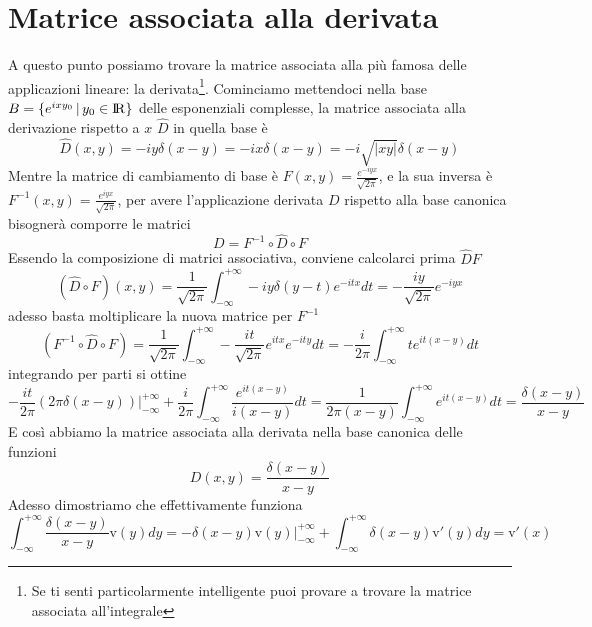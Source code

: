 \documentclass[11pt,a4paper]{report}
\newcommand{\vettorec}[1]{\textrm{#1}}
\theoremstyle{definition}
\theoremstyle{plain}
\theoremstyle{plain}
\begin{document}
		\section{Matrice associata alla derivata}
			A questo punto possiamo trovare la matrice associata alla più famosa delle applicazioni lineare: la derivata\footnote{Se ti senti particolarmente intelligente puoi provare a trovare la matrice associata all'integrale}.\newline
			Cominciamo mettendoci nella base $B=\{e^{ixy_0}\,|\,y_0 \in \rm I\!R \}$ delle esponenziali complesse, la matrice associata alla derivazione rispetto a $x$ $\widehat{D}$ in quella base è 
			\begin{equation}
				\widehat{D}(x,y)=-iy\delta (x-y)=-ix\delta(x-y)=-i\sqrt{|xy|}\delta(x-y)
			\end{equation}
			Mentre la matrice di cambiamento di base è $F(x,y)=\frac{e^{-iyx}}{\sqrt{2\pi}}$, e la sua inversa è $F^{-1}(x,y)=\frac{e^{iyx}}{\sqrt{2\pi}}$, per avere l'applicazione derivata $D$ rispetto alla base canonica bisognerà comporre le matrici
			\begin{equation}
				D=F^{-1}\circ \widehat{D}\circ F
			\end{equation}
			Essendo la composizione di matrici associativa, conviene calcolarci prima $\widehat{D}F$
			\[
				(\widehat{D}\circ F)(x,y)=\frac{1}{\sqrt{2\pi}}\int_{-\infty}^{+\infty}
				-iy\delta(y-t)e^{-itx}dt=-\frac{iy}{\sqrt{2\pi}}e^{-iyx}
			\]
			adesso basta moltiplicare la nuova matrice per $F^{-1}$
			\[
				(F^{-1}\circ \widehat{D}\circ F)=
				\frac{1}{\sqrt{2\pi}}\int_{-\infty}^{+\infty}-\frac{it}{\sqrt{2\pi}}e^{itx}e^{-ity}dt=
				-\frac{i}{2\pi}\int_{-\infty}^{+\infty}te^{it(x-y)}dt
			\]
			integrando per parti si ottine
			\[
				-\frac{it}{2\pi}(2\pi\delta(x-y))\bigg\rvert_{-\infty}^{+\infty}+
				\frac{i}{2\pi}\int_{-\infty}^{+\infty}\frac{e^{it(x-y)}}{i(x-y)}dt=
				\frac{1}{2\pi(x-y)}\int_{-\infty}^{+\infty}e^{it(x-y)}dt=\frac{\delta(x-y)}{x-y}
			\]
			E così abbiamo la matrice associata alla derivata nella base canonica delle funzioni
			\begin{equation}
				D(x,y)=\frac{\delta(x-y)}{x-y}
			\end{equation}
			Adesso dimostriamo che effettivamente funziona
			\[
				\int_{-\infty}^{+\infty}\frac{\delta(x-y)}{x-y}\vettorec v(y)dy=-\delta(x-y)\vettorec v(y)\big\rvert_{-\infty}^{+\infty}+\int_{-\infty}^{+\infty}\delta(x-y)\vettorec v'(y)dy=\vettorec v'(x)
			\]
\end{document}
